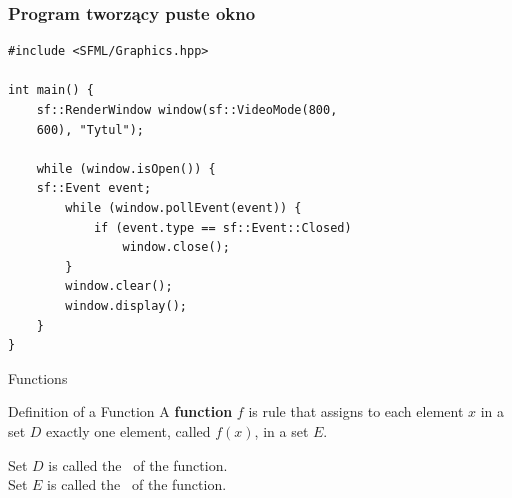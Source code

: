 \documentclass[12pt]{beamer}
\begin{document}
    \begin{frame}[fragile]
        \frametitle{Program tworzący puste okno}
        \begin{lstlisting}         
#include <SFML/Graphics.hpp>
 
int main() {
    sf::RenderWindow window(sf::VideoMode(800, 
    600), "Tytul");

    while (window.isOpen()) {
    sf::Event event;
        while (window.pollEvent(event)) {
            if (event.type == sf::Event::Closed)
                window.close();
        }       
        window.clear();       
        window.display();
    }
}

        \end{lstlisting}
    \end{frame}
    


    \begin{frame}[t]{Functions}\vspace{4pt}

        \begin{block}{Definition of a Function}
            \vspace{0.5em}
                A \textbf{function} $f$ is rule that assigns to each element 
                $x$ in a set $D$ exactly one element, called $f(x)$, 
                in a set $E$.
            \vspace{0.5em}
        \end{block}

        \vspace{10pt}
        Set $D$ is called the 
        \, of the function. \\[10pt]

        Set $E$ is called the 
        \only<1>{ \line(1,0){50} }
        \, of the function.

    \end{frame}
\end{document}
